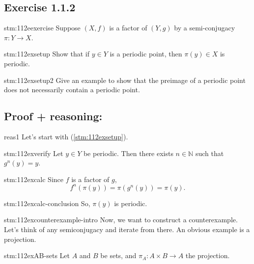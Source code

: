 \subsection*{Exercise 1.1.2}

\begin{exercise}{stm:112eexercise}
Suppose $(X,f)$ is a factor of $(Y,g)$ by a semi-conjugacy $\pi\colon Y \to X$.
\end{exercise}

\begin{exercise}{stm:112exsetup}
Show that if $y \in Y$ is a periodic point, then $\pi(y) \in X$ is periodic.
\end{exercise}

\begin{exercise}{stm:112exsetup2}
Give an example to show that the preimage of a periodic point does not necessarily contain a periodic point.
\end{exercise}

\subsection*{Proof {\color{blue} + reasoning}:}

\begin{explanation}{reas1}
Let's start with (\ref{stm:112exsetup}).
\end{explanation}

\begin{statement}{stm:112exverify}
Let $y \in Y$ be periodic. Then there exists $n \in \mathbb{N}$ such that $g^n(y) = y$.
\end{statement}

\begin{statement}{stm:112excalc}
Since $f$ is a factor of $g$,
$$
f^n(\pi(y)) = \pi(g^n(y)) = \pi(y).
$$
\end{statement}

\begin{statement}{stm:112excalc-conclusion}
So, $\pi(y)$ is periodic.
\end{statement}

\begin{explanation}{stm:112excounterexample-intro}
Now, we want to construct a counterexample. Let's think of any semiconjugacy and iterate from there. An obvious example is a projection.
\end{explanation}

\begin{statement}{stm:112exAB-sets}
Let $A$ and $B$ be sets, and $\pi_A\colon A \times B \to A$ the projection.
\end{statement}

